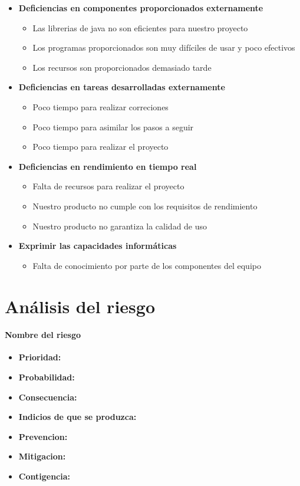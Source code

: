 \documentclass[spanish,a4paper,12pt]{report}	%
\begin{document}
\begin{itemize}
\begin{itemize}
	\end{itemize}
\item \textbf {Deficiencias en componentes proporcionados externamente}
	\begin{itemize}
		\item {Las librerias de java no son eficientes para nuestro proyecto}
		\item {Los programas proporcionados son muy difíciles de usar y poco efectivos}
		\item {Los recursos son proporcionados demasiado tarde}

	\end{itemize}
\item \textbf {Deficiencias en tareas desarrolladas externamente}
	\begin{itemize}
		\item {Poco tiempo para realizar correciones}
		\item {Poco tiempo para asimilar los pasos a seguir}
		\item {Poco tiempo para realizar el proyecto}
	\end{itemize}
\item \textbf {Deficiencias en rendimiento en tiempo real}
	\begin{itemize}
		\item {Falta de recursos para realizar el proyecto}
		\item {Nuestro producto no cumple con los requisitos de rendimiento}
		\item {Nuestro producto no garantiza la calidad de uso}
	\end{itemize}
\item \textbf {Exprimir las capacidades informáticas}
	\begin{itemize}
		\item {Falta de conocimiento por parte de los componentes del equipo}
	\end{itemize}
\end{itemize}


\newpage
\mbox{}
\thispagestyle{empty}						%
\newpage

\part{Análisis del riesgo}

\subsection*{Nombre del riesgo}			%
	\begin{itemize}
		\item \textbf {Prioridad: }
		\item \textbf {Probabilidad: }
		\item \textbf {Consecuencia: }
		\item \textbf {Indicios de que se produzca: }
		\item \textbf {Prevencion: }
		\item \textbf {Mitigacion: }
		\item \textbf {Contigencia: }
	\end{itemize}
\end{document}
